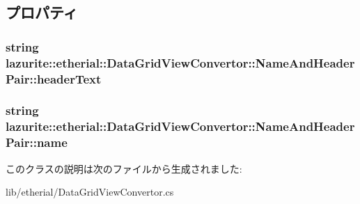 \subsection{プロパティ}
\hypertarget{classlazurite_1_1etherial_1_1_data_grid_view_convertor_1_1_name_and_header_pair_af2a92bbbc8da59d41c5583ebd2bbacd9}{
\subsubsection[{headerText}]{\setlength{\rightskip}{0pt plus 5cm}string lazurite::etherial::DataGridViewConvertor::NameAndHeaderPair::headerText}}
\label{classlazurite_1_1etherial_1_1_data_grid_view_convertor_1_1_name_and_header_pair_af2a92bbbc8da59d41c5583ebd2bbacd9}
\hypertarget{classlazurite_1_1etherial_1_1_data_grid_view_convertor_1_1_name_and_header_pair_a39392fc89bef948ec3bdf1e371b0716e}{
\subsubsection[{name}]{\setlength{\rightskip}{0pt plus 5cm}string lazurite::etherial::DataGridViewConvertor::NameAndHeaderPair::name}}
\label{classlazurite_1_1etherial_1_1_data_grid_view_convertor_1_1_name_and_header_pair_a39392fc89bef948ec3bdf1e371b0716e}


このクラスの説明は次のファイルから生成されました:\begin{DoxyCompactItemize}
\item 
lib/etherial/DataGridViewConvertor.cs\end{DoxyCompactItemize}
